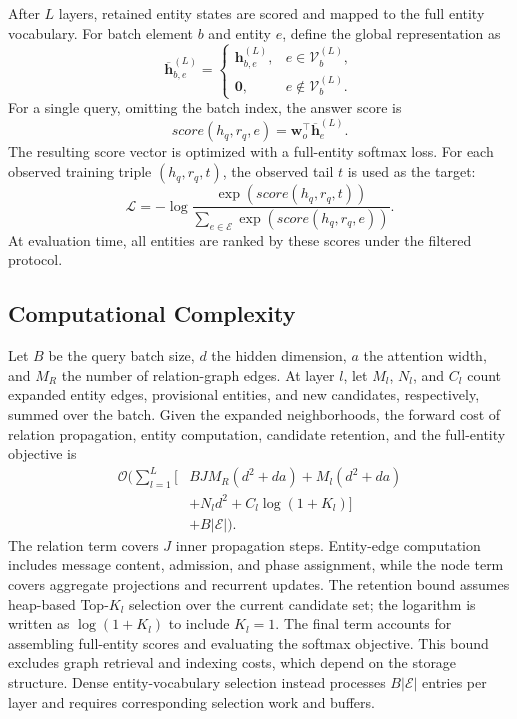 \documentclass[a4paper,fleqn]{cas-dc}
\begin{document}
After $L$ layers, retained entity states are scored and mapped to the full entity vocabulary. For batch element $b$ and entity $e$, define the global representation as
\begin{equation}
\overline{\mathbf{h}}_{b,e}^{(L)}
=
\begin{cases}
\mathbf{h}_{b,e}^{(L)}, & e\in\mathcal{V}_{b}^{(L)},\\
\mathbf{0}, & e\notin\mathcal{V}_{b}^{(L)}.
\end{cases}
\label{eq:global-candidate-representation}
\end{equation}
For a single query, omitting the batch index, the answer score is
\begin{equation}
score(h_q,r_q,e)
=
\mathbf{w}_{o}^{\top}
\overline{\mathbf{h}}_{e}^{(L)}.
\label{eq:global-candidate-score}
\end{equation}
The resulting score vector is optimized with a full-entity softmax loss. For each observed training triple $(h_q,r_q,t)$, the observed tail $t$ is used as the target:
\begin{equation}
\mathcal{L}
=
-
\log
\frac{
\exp\left(score(h_q,r_q,t)\right)
}{
\sum_{e\in\mathcal{E}}
\exp\left(score(h_q,r_q,e)\right)
}.
\label{eq:training-objective}
\end{equation}
At evaluation time, all entities are ranked by these scores under the filtered protocol.

\subsection{Computational Complexity}\label{subsec:computational-complexity}

Let $B$ be the query batch size, $d$ the hidden dimension, $a$ the attention width, and $M_R$ the number of relation-graph edges. At layer $l$, let $M_l$, $N_l$, and $C_l$ count expanded entity edges, provisional entities, and new candidates, respectively, summed over the batch. Given the expanded neighborhoods, the forward cost of relation propagation, entity computation, candidate retention, and the full-entity objective is
\begin{equation}
\begin{split}
\mathcal{O}\!\Bigg(
\sum_{l=1}^{L}
\Biggl[
{}&BJM_R(d^2+da)
+M_l(d^2+da)\\
{}&+N_ld^2
+C_l\log(1+K_l)
\Biggr]\\
{}&+B|\mathcal{E}|
\Bigg).
\end{split}
\label{eq:computational-complexity}
\end{equation}
The relation term covers $J$ inner propagation steps. Entity-edge computation includes message content, admission, and phase assignment, while the node term covers aggregate projections and recurrent updates. The retention bound assumes heap-based Top-$K_l$ selection over the current candidate set; the logarithm is written as $\log(1+K_l)$ to include $K_l=1$. The final term accounts for assembling full-entity scores and evaluating the softmax objective. This bound excludes graph retrieval and indexing costs, which depend on the storage structure. Dense entity-vocabulary selection instead processes $B|\mathcal{E}|$ entries per layer and requires corresponding selection work and buffers.
\end{document}
